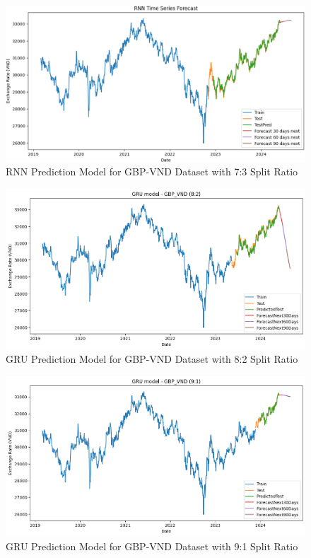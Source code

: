 \documentclass{ieeeojies}
\begin{document}
\begin{figure}[H]
  \centering
  \begin{minipage}{0.8\linewidth}
    \centering
    \includegraphics[width=\linewidth]{RNN/rnn_gbp_73.png}
    \caption{RNN Prediction Model for GBP-VND Dataset with 7:3 Split Ratio}
    \label{fig29}
  \end{minipage}
\end{figure}
\begin{figure}[H]
  \centering
  \begin{minipage}{0.8\linewidth}
    \centering
    \includegraphics[width=\linewidth]{GRU/GRU_gbp_82.png}
    \caption{GRU Prediction Model for GBP-VND Dataset with 8:2 Split Ratio}
    \label{fig30}
  \end{minipage}
\end{figure}
\begin{figure}[H]
  \centering
  \begin{minipage}{0.8\linewidth}
    \centering
    \includegraphics[width=\linewidth]{GRU/GRU_gbp_91.png}
    \caption{GRU Prediction Model for GBP-VND Dataset with 9:1 Split Ratio}
    \label{fig31}
  \end{minipage}
\end{figure}
\end{document}
